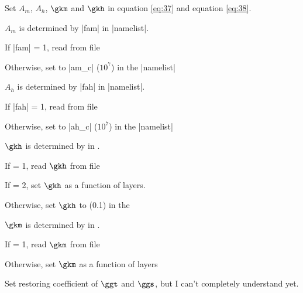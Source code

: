 
Set $A_m$, $A_h$, $\gkm$ and $\gkh$ in equation \ref{eq:37} and
equation \ref{eq:38}.

$A_m$ is determined by |fam| in |namelist|.
\bi
\item If |fam| = 1, read from file
\item Otherwise, set to |am_c| ($10^7$) in the |namelist|
\ei

$A_h$ is determined by |fah| in |namelist|.
\bi
\item If |fah| = 1, read from file
\item Otherwise, set to |ah_c| ($10^7$) in the |namelist|
\ei

$\gkh$ is determined by  in .
\bi
\item If  = 1, read $\gkh$ from file
\item If  = 2, set $\gkh$ as a function of layers.
\item Otherwise, set $\gkh$ to  (0.1) in the 
\ei

$\gkm$ is determined by  in .
\bi
\item If  = 1, read $\gkm$ from file
\item Otherwise, set $\gkm$ as a function of layers
\ei

Set restoring coefficient of $\ggt$ and $\ggs$, 
{\color{red}but I can't completely understand yet.}


